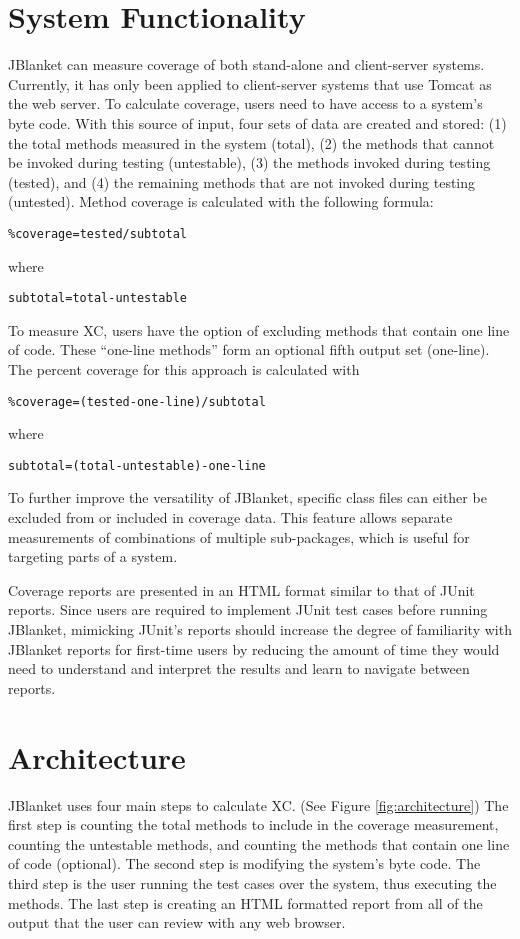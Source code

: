 \section{System Functionality}
JBlanket can measure coverage of both stand-alone and client-server
systems.  Currently, it has only been applied to client-server systems that
use Tomcat as the web server. To calculate coverage, users need to have
access to a system's byte code. With this source of input, four sets of
data are created and stored: (1) the total methods measured in the system
(total), (2) the methods that cannot be invoked during testing
(untestable), (3) the methods invoked during testing (tested), and (4) the
remaining methods that are not invoked during testing (untested).  Method
coverage is calculated with the following formula:

\begin{alltt}
\% coverage = tested / subtotal
\end{alltt}
where
\begin{alltt}
subtotal = total - untestable
\end{alltt}
To measure XC, users have the option of excluding methods that contain one
line of code. These ``one-line methods'' form an optional fifth output set
(one-line). The percent coverage for this approach is calculated with

\begin{alltt}
\% coverage = (tested - one-line) / subtotal
\end{alltt}
where
\begin{alltt}
subtotal = (total - untestable) - one-line
\end{alltt}
To further improve the versatility of JBlanket, specific class files can
either be excluded from or included in coverage data. This feature allows
separate measurements of combinations of multiple sub-packages, which is
useful for targeting parts of a system.

Coverage reports are presented in an HTML format similar to that of JUnit
reports. Since users are required to implement JUnit test cases before
running JBlanket, mimicking JUnit's reports should increase the degree of
familiarity with JBlanket reports for first-time users by reducing the
amount of time they would need to understand and interpret the results and
learn to navigate between reports.

\section{Architecture}
JBlanket uses four main steps to calculate XC. (See Figure
\ref{fig:architecture}) The first step is counting the total methods to
include in the coverage measurement, counting the untestable methods, and
counting the methods that contain one line of code (optional).  The second
step is modifying the system's byte code.  The third step is the user
running the test cases over the system, thus executing the methods.  The
last step is creating an HTML formatted report from all of the output that
the user can review with any web browser.

